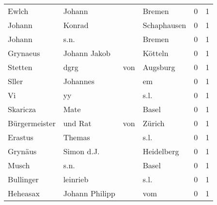 \begin{tabular}{llllrr}
                    Ewlch &                             Johann &             &                                      Bremen &          0 &         1 \\
                   Johann &                             Konrad &             &                                 Schaphausen &          0 &         1 \\
                   Johann &                               s.n. &             &                                      Bremen &          0 &         1 \\
                 Grynaeus &                       Johann Jakob &             &                                     Kötteln &          0 &         1 \\
                  Stetten &                               dgrg &         von &                                    Augsburg &          0 &         1 \\
                    Sller &                           Johannes &             &                                          em &          0 &         1 \\
                       Vi &                                 yy &             &                                        s.l. &          0 &         1 \\
                 Skaricza &                               Mate &             &                                       Basel &          0 &         1 \\
            Bürgermeister &                            und Rat &         von &                                      Zürich &          0 &         1 \\
                  Erastus &                             Themas &             &                                        s.l. &          0 &         1 \\
                  Grynäus &                         Simon d.J. &             &                                  Heidelberg &          0 &         1 \\
                    Musch &                               s.n. &             &                                       Basel &          0 &         1 \\
                Bullinger &                           leinrieb &             &                                        s.l. &          0 &         1 \\
                 Heheasax &                     Johann Philipp &             &                                         vom &          0 &         1 \\

\end{tabular}
